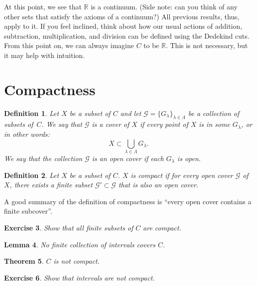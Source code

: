 \documentclass{amsart}
\newtheorem{theorem}{Theorem}
\newtheorem{lemma}[theorem]{Lemma}
\newtheorem{definition}[theorem]{Definition}
\newtheorem{exercise}[theorem]{Exercise}
\newcommand{\R}{\mathbb R}
\newcommand{\1}{\mathds{1}}
\def \R {{\mathbb {R}}}
\numberwithin{equation}{section}
\numberwithin{theorem}{section}
\begin{document}
At this point, we see that $\R$ is a continuum.  (Side note: can you think of any other sets that satisfy the axioms of a continuum?)  All previous results, thus, apply to it.  If you feel inclined, think about how our usual actions of addition, subtraction, multiplication, and division can be defined using the Dedekind cuts.  From this point on, we can always imagine $C$ to be $\R$.  This is not necessary, but it may help with intuition.










\section{Compactness}



\begin{definition}  Let $X$ be a subset of $C$ and let $\mathcal{G} = \{ G_{\lambda} \}_{\lambda \in \Lambda}$ be a collection of subsets of~$C$.  We say that $\mathcal{G}$ is a \emph{cover} of $X$ if every point of $X$ is in some $G_{\lambda}$, or in other words:
\[
X \subset \bigcup_{\lambda \in \Lambda} G_{\lambda}.
\]
We say that the collection $\mathcal{G}$ is an \emph{open cover} if each $G_{\lambda}$ is open.
\end{definition}

\begin{definition}  Let $X$ be a subset of $C$.  $X$ is \emph{compact} if for every open cover $\mathcal{G}$ of $X$, there exists a finite subset $\mathcal{G}' \subset \mathcal{G}$ that is also an open cover.
\end{definition}

\noindent  A good summary of the definition of compactness is ``every open cover contains a finite subcover''.


\begin{exercise}
Show that all finite subsets of $C$ are compact.
\end{exercise} 

\begin{lemma}
No finite collection of intervals covers $C$.
\end{lemma}

\begin{theorem}  
$C$ is not compact.

\end{theorem}


\begin{exercise}
Show that intervals are not compact.
\end{exercise} 
\end{document}
